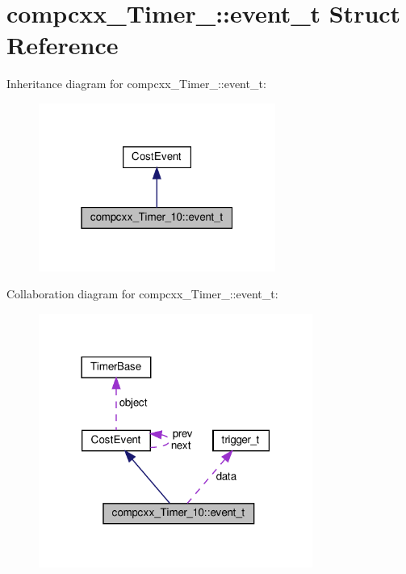 \hypertarget{structcompcxx__Timer__10_1_1event__t}{}\section{compcxx\+\_\+\+Timer\+\_\+:\+:event\+\_\+t Struct Reference}
\label{structcompcxx__Timer__10_1_1event__t}


Inheritance diagram for compcxx\+\_\+\+Timer\+\_\+:\+:event\+\_\+t\+:\nopagebreak
\begin{figure}[H]
\begin{center}
\leavevmode
\includegraphics[width=220pt]{structcompcxx__Timer__10_1_1event__t__inherit__graph}
\end{center}
\end{figure}


Collaboration diagram for compcxx\+\_\+\+Timer\+\_\+:\+:event\+\_\+t\+:\nopagebreak
\begin{figure}[H]
\begin{center}
\leavevmode
\includegraphics[width=254pt]{structcompcxx__Timer__10_1_1event__t__coll__graph}
\end{center}
\end{figure}
